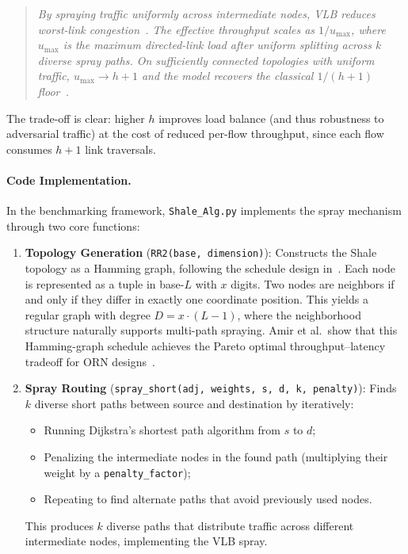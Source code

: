 \documentclass{article}
\begin{document}
    \begin{quote}
    \textit{By spraying traffic uniformly across intermediate nodes, VLB reduces worst-link congestion~\cite{shale}.  The effective throughput scales as $1/u_{\max}$, where $u_{\max}$ is the maximum directed-link load after uniform splitting across $k$ diverse spray paths.  On sufficiently connected topologies with uniform traffic, $u_{\max} \to h{+}1$ and the model recovers the classical $1/(h{+}1)$ floor~\cite{shale}.}
    \end{quote}

    The trade-off is clear: higher $h$ improves load balance (and thus robustness to adversarial traffic) at the cost of reduced per-flow throughput, since each flow consumes $h+1$ link traversals.

    \paragraph{Code Implementation.}
    In the benchmarking framework, {\tt Shale\_Alg.py} implements the spray mechanism through two core functions:

    \begin{enumerate}
        \item \textbf{Topology Generation} (\texttt{RR2(base, dimension)}): Constructs the Shale topology as a Hamming graph, following the schedule design in~\cite{shale}. Each node is represented as a tuple in base-$L$ with $x$ digits. Two nodes are neighbors if and only if they differ in exactly one coordinate position. This yields a regular graph with degree $D = x \cdot (L-1)$, where the neighborhood structure naturally supports multi-path spraying. Amir et al.\ show that this Hamming-graph schedule achieves the Pareto optimal throughput--latency tradeoff for ORN designs~\cite{shale}.

        \item \textbf{Spray Routing} (\texttt{spray\_short(adj, weights, s, d, k, penalty)}): Finds $k$ diverse short paths between source and destination by iteratively:
        \begin{itemize}
            \item Running Dijkstra's shortest path algorithm from $s$ to $d$;
            \item Penalizing the intermediate nodes in the found path (multiplying their weight by a {\tt penalty\_factor});
            \item Repeating to find alternate paths that avoid previously used nodes.
        \end{itemize}
        This produces $k$ diverse paths that distribute traffic across different intermediate nodes, implementing the VLB spray.
    \end{enumerate}
\end{document}
